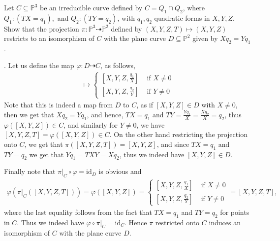 \documentclass[12pt]{article}
\begin{document}
\begin{prob}
    Let $C \subseteq \mathbb{P}^3$ be an irreducible curve defined by $C = Q_1 \cap Q_2$, where $Q_1 : (TX = q_1),$ and $Q_2 : (TY = q_2)$, with $q_1,q_2$ quadratic forms in $X,Y,Z$. Show that the projection $\pi : \mathbb{P}^3  \dashrightarrow \mathbb{P}^2$ defined by $(X,Y,Z,T) \mapsto (X,Y,Z)$ restricts to an isomorphism of $C$ with the plane curve $D \subseteq \mathbb{P}^2$ given by $Xq_2 = Yq_1$.
\end{prob}

\sol.
Let us define the map $\varphi : D \dashrightarrow C$, as follows,
\begin{align*}
    [X,Y,Z] \mapsto \begin{cases} [X,Y,Z,\frac{q_1}{X}] & \mbox{ if } X \neq 0 \\
              [X,Y,Z,\frac{q_2}{Y}] & \mbox{ if } Y \neq 0\end{cases}
\end{align*}
Note that this is indeed a map from $D$ to $C$, as if $[X,Y,Z] \in D$ with $X \neq 0$, then we get that $Xq_2 = Yq_1$, and hence, $TX = q_1$ and $TY = \frac{Yq_1}{X} = \frac{Xq_2}{X} = q_2$, thus $\varphi([X,Y,Z]) \in C$, and similarly for $Y \neq 0$, we have $[X,Y,Z,T] = \varphi([X,Y,Z]) \in C$. On the other hand restricting the projection onto $C$, we get that $\pi([X,Y,Z,T]) = [X,Y,Z]$, and since $TX = q_1$ and $TY = q_2 $ we get that $Yq_1 = TXY = Xq_2$, thus we indeed have $[X,Y,Z] \in D$.

Finally note that $\pi\vert_C \circ \varphi = \mathrm{id}_D$ is obvious and
\begin{align*}
    \varphi(\pi\vert_C([X,Y,Z,T])) = \varphi([X,Y,Z]) = \begin{cases}
                                                            [X,Y,Z,\frac{q_1}{X}] & \mbox{ if } X \neq 0 \\
                                                            [X,Y,Z,\frac{q_2}{Y}] & \mbox{ if } Y \neq 0
                                                        \end{cases} = [X,Y,Z,T],
\end{align*}
where the last equality follows from the fact that $TX = q_1$ and $TY = q_2$ for points in $C$. Thus we indeed have $\varphi \circ \pi\vert_C = \mathrm{id}_C$. Hence $\pi$ restricted onto $C$ induces an isomorphism of $C$ with the plane curve $D$.
\end{document}
